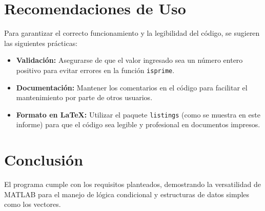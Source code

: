 \documentclass[12pt,a4paper]{article}
\begin{document}
\section{Recomendaciones de Uso}
Para garantizar el correcto funcionamiento y la legibilidad del código, se sugieren las siguientes prácticas:
\begin{itemize}
    \item \textbf{Validación:} Asegurarse de que el valor ingresado sea un número entero positivo para evitar errores en la función \texttt{isprime}.
    \item \textbf{Documentación:} Mantener los comentarios en el código para facilitar el mantenimiento por parte de otros usuarios.
    \item \textbf{Formato en LaTeX:} Utilizar el paquete \texttt{listings} (como se muestra en este informe) para que el código sea legible y profesional en documentos impresos.
\end{itemize}

\section{Conclusión}
El programa cumple con los requisitos planteados, demostrando la versatilidad de MATLAB para el manejo de lógica condicional y estructuras de datos simples como los vectores.
\end{document}
